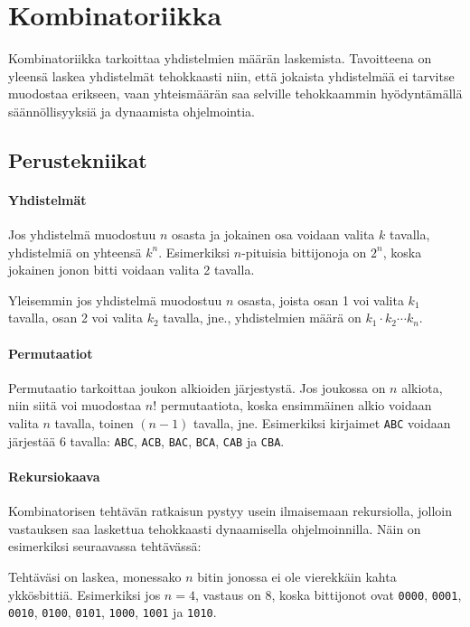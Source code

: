 \chapter{Kombinatoriikka}

Kombinatoriikka tarkoittaa yhdistelmien määrän laskemista.
Tavoitteena on yleensä laskea yhdistelmät
tehokkaasti niin, että jokaista yhdistelmää
ei tarvitse muodostaa erikseen, vaan yhteismäärän
saa selville tehokkaammin hyödyntämällä säännöllisyyksiä ja
dynaamista ohjelmointia.

\section{Perustekniikat}

\subsubsection*{Yhdistelmät}

Jos yhdistelmä muodostuu $n$ osasta ja jokainen osa
voidaan valita $k$ tavalla, yhdistelmiä on yhteensä $k^n$.
Esimerkiksi $n$-pituisia bittijonoja on $2^n$,
koska jokainen jonon bitti voidaan valita 2 tavalla.

Yleisemmin jos yhdistelmä muodostuu $n$ osasta,
joista osan 1 voi valita $k_1$ tavalla,
osan 2 voi valita $k_2$ tavalla, jne.,
yhdistelmien määrä on $k_1 \cdot k_2 \cdots k_n$.

\subsubsection*{Permutaatiot}

Permutaatio tarkoittaa joukon alkioiden järjestystä.
Jos joukossa on $n$ alkiota,
niin siitä voi muodostaa $n!$ permutaatiota,
koska ensimmäinen alkio voidaan valita $n$ tavalla,
toinen $(n-1)$ tavalla, jne.
Esimerkiksi kirjaimet \texttt{ABC} voidaan järjestää
6 tavalla:
\texttt{ABC}, \texttt{ACB}, \texttt{BAC}, \texttt{BCA},
\texttt{CAB} ja \texttt{CBA}.

\subsubsection*{Rekursiokaava}

Kombinatorisen tehtävän ratkaisun pystyy usein ilmaisemaan
rekursiolla, jolloin vastauksen saa laskettua tehokkaasti
dynaamisella ohjelmoinnilla.
Näin on esimerkiksi seuraavassa tehtävässä:

\begin{task}
Tehtäväsi on laskea, monessako $n$ bitin jonossa
ei ole vierekkäin kahta ykkösbittiä.
Esimerkiksi jos $n=4$, vastaus on 8,
koska bittijonot ovat \texttt{0000}, \texttt{0001},
\texttt{0010}, \texttt{0100}, \texttt{0101},
\texttt{1000}, \texttt{1001} ja \texttt{1010}.
\end{task}


